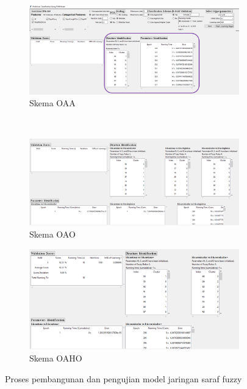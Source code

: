 \begin{figure}[h!]
\begin{subfigure}[h]{\textwidth}
  \centering
  \includegraphics[width=.93\linewidth]{SSprogram/09.png}  
  \caption{Skema OAA}
  \label{fig: ss 09}
\end{subfigure}
\\
\begin{subfigure}[h]{0.5\textwidth}
  \centering
  \includegraphics[width=.98\linewidth]{SSprogram/09b.png}
  \caption{Skema OAO}
  \label{fig: ss 09b}
\end{subfigure}%
\begin{subfigure}[h]{0.5\textwidth}
  \centering
  \includegraphics[width=.93\linewidth]{SSprogram/09c.png}  
  \caption{Skema OAHO}
  \label{fig: ss 09c}
\end{subfigure}
\caption{Proses pembangunan dan pengujian model jaringan saraf fuzzy}
\label{fig: proses pembelajaran dan pengujian}
\end{figure}

